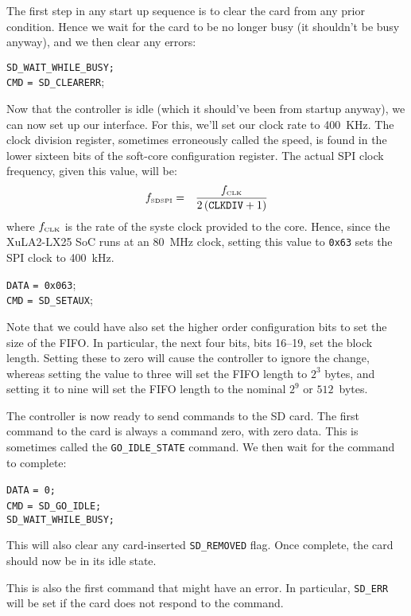 \documentclass{gqtekspec}
\begin{document}
The first step in any start up sequence is to clear the card from any
prior condition.  Hence we wait for the card to be no longer busy (it 
shouldn't be busy anyway), and we then clear any errors:
\begin{tabbing}
{\tt SD\_WAIT\_WHILE\_BUSY;} \\
{\tt CMD} \= {\tt = SD\_CLEARERR};
\end{tabbing}

Now that the controller is idle (which it should've been from startup anyway),
we can now set up our interface.  For this, we'll set our clock rate to 400~KHz.
The clock division register, sometimes erroneously called the speed, is found
in the lower sixteen bits of the soft-core configuration register.  The actual
SPI clock frequency, given this value, will be:
\begin{eqnarray}
f_{\mbox{\tiny SDSPI}} &=& \frac{f_{\mbox{\tiny CLK}}}{2\left(\mbox{\tt CLKDIV}+1\right)}
\end{eqnarray}
where $f_{\mbox{\tiny CLK}}$ is the rate of the syste clock provided to the
core.  Hence, since the XuLA2-LX25 SoC runs at an 80~MHz clock, setting this
value to {\tt 0x63} sets the SPI clock to 400~kHz.
\begin{tabbing}
{\tt DATA} \= {\tt = 0x063}; \\
{\tt CMD} \> {\tt = SD\_SETAUX};
\end{tabbing}
Note that we could have also set the higher order configuration bits to set
the size of the FIFO.  In particular, the next four bits, bits 16--19, set
the block length.  Setting these to zero will cause the controller to ignore
the change, whereas setting the value to three will set the FIFO length to
$2^3$ bytes, and setting it to nine will set the FIFO length to the
nominal $2^9$ or $512$~bytes.

The controller is now ready to send commands to the SD card.  The first command
to the card is always a command zero, with zero data.  This is sometimes called
the \hbox{\tt GO\_IDLE\_STATE} command.  We then wait for the command to
complete:
\begin{tabbing}
{\tt DATA} \= {\tt = 0;} \\
{\tt CMD} \> {\tt = SD\_GO\_IDLE;} \\
{\tt SD\_WAIT\_WHILE\_BUSY;}
\end{tabbing}
This will also clear any card-inserted {\tt SD\_REMOVED} flag.  Once complete,
the card should now be in its idle state.

This is also the first command that might have an error.  In particular,
{\tt SD\_ERR} will be set if the card does not respond to the command.
\end{document}
